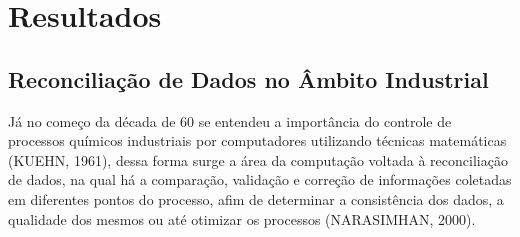 \chapter{Resultados} \label{resultado}

\section{Reconciliação de Dados no Âmbito Industrial}

Já no começo da década de 60 se entendeu a importância do controle de processos químicos industriais por computadores utilizando técnicas matemáticas (KUEHN, 1961), dessa forma surge a área da computação voltada à reconciliação de dados, na qual há a comparação, validação e correção de informações coletadas em diferentes pontos do processo, afim de determinar a consistência dos dados, a qualidade dos mesmos ou até otimizar os processos (NARASIMHAN, 2000).
